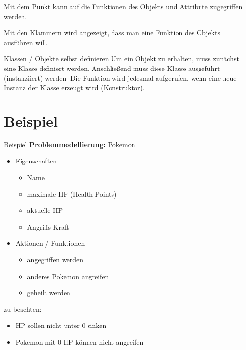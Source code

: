 \begin{frame}
	Mit dem Punkt  kann auf die Funktionen des Objekts und Attribute zugegriffen werden.
	
	Mit den Klammern wird angezeigt, dass man eine Funktion des Objekts ausführen will.
	
\end{frame}
\begin{frame}{Klassen / Objekte selbst definieren}
	Um ein Objekt zu erhalten, muss zunächst eine Klasse definiert werden. Anschließend muss diese Klasse ausgeführt (instanziiert) werden. Die  Funktion wird jedesmal aufgerufen, wenn eine neue Instanz der Klasse erzeugt wird (Konstruktor).
	
	
\end{frame}

\section{Beispiel}
\begin{frame}{Beispiel}
	\textbf{Problemmodellierung:}
	Pokemon
	\begin{itemize}
		\item Eigenschaften
		\begin{itemize}
			\item Name
			\item maximale HP (Health Points)
			\item aktuelle HP
			\item Angriffs Kraft
		\end{itemize}
		\item Aktionen / Funktionen
		\begin{itemize}
			\item angegriffen werden
			\item anderes Pokemon angreifen
			\item geheilt werden
		\end{itemize}
	\end{itemize}
	zu beachten:
	\begin{itemize}
		\item HP sollen nicht unter 0 sinken
		\item Pokemon mit 0 HP können nicht angreifen
	\end{itemize}

\end{frame}

